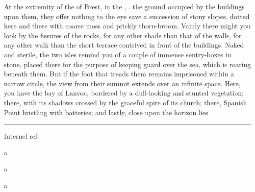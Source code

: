 \documentclass[paper=A4]{scrbook}
\begin{document}
\beginnumbering\pstart
At the extremity of the  of Brest, in the , .  the ground occupied by the buildings upon them, they offer nothing to the eye save a succession of stony slopes, dotted here and there with coarse moss and prickly thorn-broom. Vainly there might you look  by the fissures of the rocks, for any other shade than that of the walls, for any other walk than the short terrace contrived in front of the buildings. Naked and sterile, the two isles remind you of a couple of immense sentry-boxes in stone, placed there for the purpose of keeping guard over the sea, which is roaring beneath them. But if the foot that treads them remains imprisoned within a narrow circle, the view from their summit extends over an infinite space. Here, you have the bay of Lanvoc, bordered by a dull-looking and stunted vegetation; there,  with its shadows crossed by the graceful spire of its church; there, Spanish Point bristling with batteries; and lastly, close upon the horizon lies 
\pend\endnumbering
\vskip 2cm
\hrule
{}

Internel ref

 a

 a

 a

\end{document}
